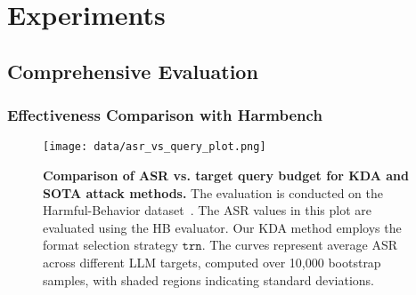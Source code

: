 





\section{Experiments}\label{sec:exp}








\subsection{Comprehensive Evaluation}

\subsubsection{Effectiveness Comparison with Harmbench}\label{sec:jailbreak_performance_comparison}



\begin{figure}[h]
\centering
    \texttt{[image: data/asr\_vs\_query\_plot.png]}
    \vspace{-4mm}
    \caption{
    \textbf{Comparison of ASR vs. target query budget for KDA and SOTA attack methods.} The evaluation is conducted on the Harmful-Behavior dataset~\citep{chao_jailbreaking_2024}. The ASR values in this plot are evaluated using the HB evaluator. Our KDA method employs the format selection strategy $\texttt{trn}$. The curves represent average ASR across different LLM targets, computed over 10,000 bootstrap samples, with shaded regions indicating standard deviations.
    }\label{fig:query_efficiency}
   \vspace{-3mm}
\end{figure}


